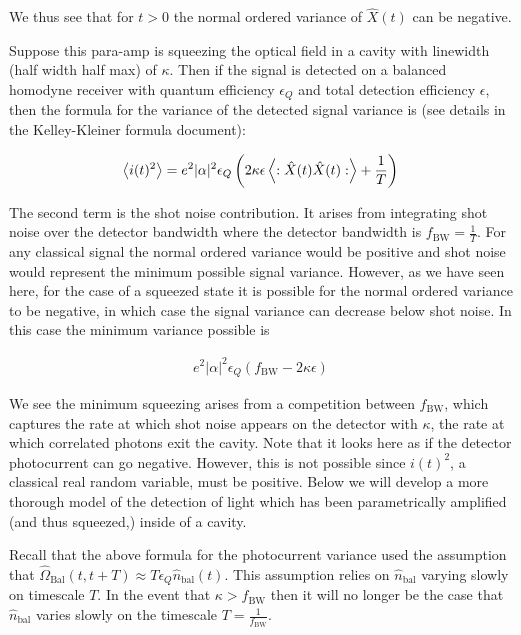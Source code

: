 \documentclass[12pt]{article}
\begin{document}
We thus see that for $t>0$ the normal ordered variance of $\hat{X}(t)$ can be negative.

Suppose this para-amp is squeezing the optical field in a cavity with linewidth (half width half max) of $\kappa$. Then if the signal is detected on a balanced homodyne receiver with quantum efficiency $\epsilon_Q$ and total detection efficiency $\epsilon$, then the formula for the variance of the detected signal variance is (see details in the Kelley-Kleiner formula document):

\begin{align}
\Braket{i(t)^2} = e^2|\alpha|^2\epsilon_Q\left( 2 \kappa \epsilon \Braket{:\hat{X}(t) \hat{X}(t):} + \frac{1}{T}\right)
\end{align}

The second term is the shot noise contribution. It arises from integrating shot noise over the detector bandwidth where the detector bandwidth is $f_{\text{BW}} = \frac{1}{T}$. For any classical signal the normal ordered variance would be positive and shot noise would represent the minimum possible signal variance. However, as we have seen here, for the case of a squeezed state it is possible for the normal ordered variance to be negative, in which case the signal variance can decrease below shot noise. In this case the minimum variance possible is

\begin{align}
e^2|\alpha|^2\epsilon_Q(f_{\text{BW}} - 2\kappa \epsilon)
\end{align}

We see the minimum squeezing arises from a competition between $f_{\text{BW}}$, which captures the rate at which shot noise appears on the detector with $\kappa$, the rate at which correlated photons exit the cavity. Note that it looks here as if the detector photocurrent can go negative. However, this is not possible since $i(t)^2$, a classical real random variable, must be positive. Below we will develop a more thorough model of the detection of light which has been parametrically amplified (and thus squeezed,) inside of a cavity.

Recall that the above formula for the photocurrent variance used the assumption that $\hat{\Omega}_{\text{Bal}}(t,t+T) \approx T \epsilon_Q \hat{n}_{\text{bal}}(t)$. This assumption relies on $\hat{n}_{\text{bal}}$ varying slowly on timescale $T$. In the event that $\kappa > f_{\text{BW}}$ then it will no longer be the case that $\hat{n}_{\text{bal}}$ varies slowly on the timescale $T = \frac{1}{f_{\text{BW}}}$.
\end{document}
